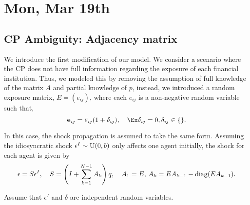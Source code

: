 \section{Mon, Mar 19th}
\subsection{CP Ambiguity: Adjacency matrix}
We introduce the first modification of our model.  We consider a scenario where the CP does not have full information regarding the exposure of each financial institution.  Thus, we modeled this by removing the assumption of full knowledge of the matrix $A$ and partial knowledge of $p$, instead, we introduced a random exposure matrix, $E=(e_{ij})$, where each $e_{ij}$ is a non-negative random variable such that,
\[\mathbf{e}_{ij}=\bar{e}_{ij}(1+\mathbf{\delta}_{ij}),\quad \Ex\delta_{ij}=0,\delta_{ij}\in\{\}.\] 

In this case, the shock propagation is assumed to take the same form.  Assuming the idiosyncratic shock $\epsilon^I\sim{\rm U}(0,b)$ only affects one agent initially, the shock for each agent is given by
\[\epsilon = S\epsilon^I,\quad S=\left( I+\sum_{k=1}^{N-1} A_k \right) q,\quad A_1=E,\,A_k=EA_{k-1}-{\rm diag}(EA_{k-1}).\]

Assume that $\epsilon^I$ and $\delta$ are independent random variables.  